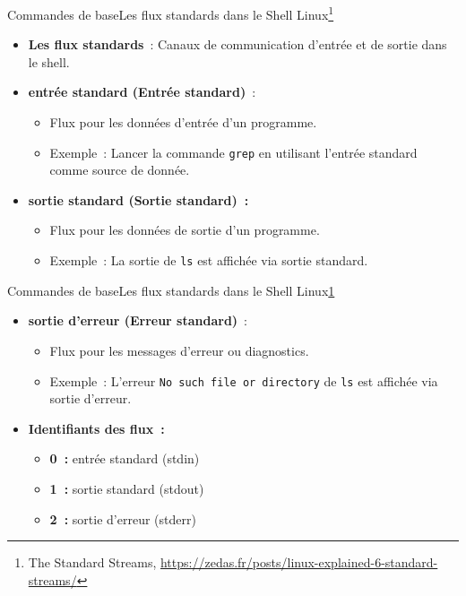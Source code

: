 \documentclass{beamer}
\begin{document}
    \begin{frame}{Commandes de base}{Les flux standards dans le Shell Linux\footnote{\label{standard-stream}The Standard Streams, \url{https://zedas.fr/posts/linux-explained-6-standard-streams/}}}
        \begin{itemize}
            \item \textbf{Les flux standards}~: Canaux de communication d'entrée et de sortie dans le shell.
            \item \textbf{entrée standard (Entrée standard)}~:
            \begin{itemize}
                \item Flux pour les données d'entrée d'un programme.
                \item Exemple~: Lancer la commande \lstinline{grep} en utilisant l'entrée standard comme source de donnée.
            \end{itemize}
            \item \textbf{sortie standard (Sortie standard)~:}
            \begin{itemize}
                \item Flux pour les données de sortie d'un programme.
                \item Exemple~: La sortie de \lstinline{ls} est affichée via sortie standard.
            \end{itemize}
        \end{itemize}
    \end{frame}

    \begin{frame}{Commandes de base}{Les flux standards dans le Shell Linux\cref{standard-stream}}
        \begin{itemize}
            \item \textbf{sortie d'erreur (Erreur standard)}~:
            \begin{itemize}
                \item Flux pour les messages d'erreur ou diagnostics.
                \item Exemple~: L'erreur \lstinline{No such file or directory} de \lstinline{ls} est affichée via sortie d'erreur.
            \end{itemize}
            \item \textbf{Identifiants des flux~:}
            \begin{itemize}
                \item \textbf{0~:} entrée standard (stdin)
                \item \textbf{1~:} sortie standard (stdout)
                \item \textbf{2~:} sortie d'erreur (stderr)
            \end{itemize}
        \end{itemize}
    \end{frame}
\end{document}
